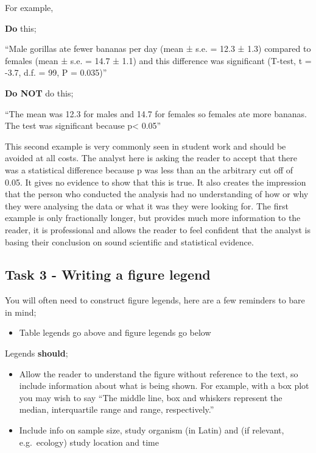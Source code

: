 \documentclass[
]{book}
\providecommand{\tightlist}{%
  \setlength{\itemsep}{0pt}\setlength{\parskip}{0pt}}
\begin{document}
For example,

\textbf{Do} this;

``Male gorillas ate fewer bananas per day (mean ± s.e. = 12.3 ± 1.3) compared to females (mean ± s.e. = 14.7 ± 1.1) and this difference was significant (T-test, t = -3.7, d.f. = 99, P = 0.035)''

\textbf{Do NOT} do this;

``The mean was 12.3 for males and 14.7 for females so females ate more bananas. The test was significant because p\textless{} 0.05''

This second example is very commonly seen in student work and should be avoided at all costs. The analyst here is asking the reader to accept that there was a statistical difference because p was less than an the arbitrary cut off of 0.05. It gives no evidence to show that this is true. It also creates the impression that the person who conducted the analysis had no understanding of how or why they were analysing the data or what it was they were looking for. The first example is only fractionally longer, but provides much more information to the reader, it is professional and allows the reader to feel confident that the analyst is basing their conclusion on sound scientific and statistical evidence.

\hypertarget{legend2}{%
\subsection{Task 3 - Writing a figure legend}\label{legend2}}

You will often need to construct figure legends, here are a few reminders to bare in mind;

\begin{itemize}
\tightlist
\item
  Table legends go above and figure legends go below
\end{itemize}

Legends \textbf{should};

\begin{itemize}
\tightlist
\item
  Allow the reader to understand the figure without reference to the text, so include information about what is being shown. For example, with a box plot you may wish to say ``The middle line, box and whiskers represent the median, interquartile range and range, respectively.''
\item
  Include info on sample size, study organism (in Latin) and (if relevant, e.g.~ecology) study location and time
\end{itemize}
\end{document}

